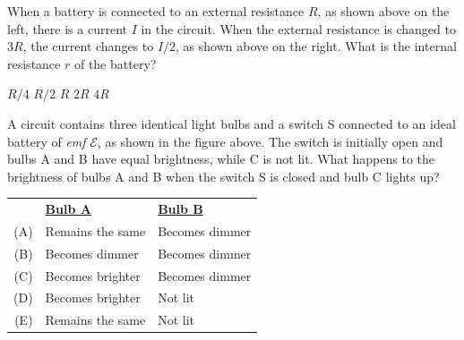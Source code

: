 \documentclass{../../../oss-apphys-exam}
\newcounter{lastmc}
\begin{document}
\begin{questions}
  \question When a battery is connected to an external resistance $R$, as shown
  above on the left, there is a current $I$ in the circuit. When the external
  resistance is changed to $3R$, the current changes to $I/2$, as shown above
  on the right. What is the internal resistance $r$ of the battery?
  \begin{choices}
    \choice$R/4$
    \choice$R/2$
    \choice$R$
    \choice$2R$
    \choice$4R$
  \end{choices}
  \newpage
  
  \question A circuit contains three identical light bulbs and a switch S
  connected to an ideal battery of \emph{emf} $\mathcal E$, as shown in the
  figure above. The switch is initially open and bulbs A and B have equal
  brightness, while C is not lit. What happens to the brightness of bulbs A and
  B when the switch S is closed and bulb C lights up?
  
  \begin{tabular}{rll}
    & \underline{\textbf{Bulb A}} & \underline{\textbf{Bulb B}}\\
    (A) & Remains the same & Becomes dimmer\\
    (B) & Becomes dimmer   & Becomes dimmer\\
    (C) & Becomes brighter & Becomes dimmer\\
    (D) & Becomes brighter & Not lit\\
    (E) & Remains the same   & Not lit
  \end{tabular}
\end{questions}
\setcounter{lastmc}{\value{question}}
\newpage
  
\end{document}
